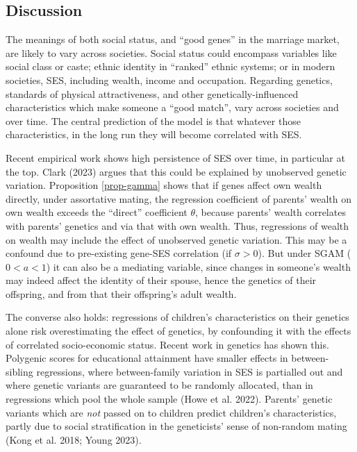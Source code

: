 \documentclass[
]{article}
\theoremstyle{definition}
\theoremstyle{definition}
\theoremstyle{definition}
\theoremstyle{definition}
\theoremstyle{remark}
\begin{document}
\subsection{Discussion}\label{discussion}

The meanings of both social status, and ``good genes'' in the
marriage market, are likely to vary across societies. Social status could
encompass variables like social class or caste; ethnic identity in
``ranked'' ethnic systems; or in modern societies, SES, including wealth, income
and occupation. Regarding genetics, standards of physical attractiveness, and
other genetically-influenced characteristics which make someone a ``good match'',
vary across societies and over time. The central prediction of the model is that
whatever those characteristics, in the long run they will become correlated with
SES.

Recent empirical work shows high persistence of SES over time, in particular at
the top. Clark (2023) argues that this could be explained by unobserved
genetic variation.
Proposition \ref{prop-gamma} shows that if genes affect own wealth directly,
under assortative mating, the regression coefficient of parents' wealth on own
wealth exceeds the ``direct'' coefficient \(\theta\), because parents' wealth
correlates with parents' genetics and via that with own wealth. Thus,
regressions of wealth on wealth may include the effect of unobserved genetic
variation. This may be a confound due to pre-existing gene-SES correlation (if
\(\sigma > 0\)). But under SGAM (\(0 < a < 1\)) it can also be a mediating
variable, since changes in someone's wealth may indeed affect the identity of
their spouse, hence the genetics of their offspring, and from that their
offspring's adult wealth.

The converse also holds: regressions of children's characteristics on their
genetics alone risk overestimating the effect of genetics, by confounding it
with the effects of correlated socio-economic status. Recent work in genetics
has shown this. Polygenic scores for educational attainment have smaller effects
in between-sibling regressions, where between-family variation in SES is
partialled out and where genetic variants are guaranteed to be randomly
allocated, than in regressions which pool the whole sample ({Howe et al.} 2022).
Parents' genetic variants which are \emph{not} passed on to children predict
children's characteristics, partly due to social stratification in the geneticists'
sense of non-random mating ({Kong et al.} 2018; Young 2023).
\end{document}
